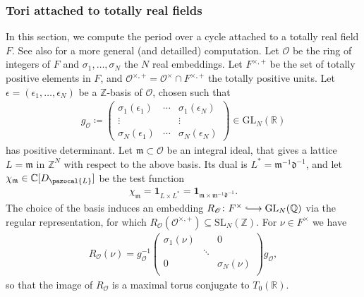 \documentclass[a4paper,11pt]{amsart} %
\newcommand{\8}{\infty}
\newcommand{\Z}{\mathbb{Z}}
\newcommand{\id}{\mathbf{1}}
\newcommand{\SL}{\mathrm{SL}}
\newcommand{\GL}{\mathrm{GL}}
\newcommand{\R}{\mathbb{R}}
\newcommand{\Q}{\mathbb{Q}}
\newcommand{\C}{\mathbb{C}}
\newcommand{\dfrak}{\mathfrak{d}}
\newcommand{\m}{\mathfrak{m}}
\newcommand{\Ocal}{\mathcal{O}}
\newcommand{\Lcal}{\pazocal{L}}
\newcommand{\hooklongrightarrow}{\lhook\joinrel\longrightarrow}
\theoremstyle{mytheoremstyle}
\theoremstyle{remark}
\numberwithin{equation}{section}
\begin{document}
 \subsubsection{Tori attached to totally real fields} \label{real tori} In this section, we compute the period over a cycle attached to a totally real field $F$. See also \cite{rbrsln2} for a more general (and detailled) computation. 
  Let $\Ocal$ be the ring of integers of $F$ and $\sigma_1,\dots,\sigma_N$ the $N$ real embeddings. Let $F^{\times,+}$ be the set of totally positive elements in $F$, and $\Ocal^{\times,+} = \Ocal^{\times} \cap F^{\times,+}$ the totally positive units. Let $\epsilon=(\epsilon_1, \dots, \epsilon_N)$ be a $\Z$-basis of $\Ocal$, chosen such that
\begin{align}
g_{\Ocal} \coloneqq \begin{pmatrix}
\sigma_1(\epsilon_1) & \cdots & \sigma_1(\epsilon_N) \\[1em]
\vdots & & \vdots \\[1em]
\sigma_N(\epsilon_1) & \cdots & \sigma_N(\epsilon_N)
\end{pmatrix} \in \GL_N(\R)
\end{align}
has positive determinant. Let $\m \subset \Ocal$ be an integral ideal, that gives a lattice $L=\m$ in $\Z^N$ with respect to the above basis. Its dual is $L^\ast=\m^{-1}\dfrak^{-1}$, and let $\chi_\m \in \C[D_{\Lcal}]$ be the test function
\begin{align}
\chi_\m=\id_{L \times L^\ast}=\id_{\m \times \m^{-1}\dfrak^{-1}}.
\end{align}
The choice of the basis induces an embedding $R_\Ocal \colon F^\times \hooklongrightarrow \GL_N(\Q)$ via the regular representation, for which $R_\Ocal(\Ocal^{\times,+}) \subseteq \SL_N(\Z)$. For $\nu \in F^\times$ we have
 \begin{align} \label{equiv embed F}
R_\Ocal(\nu)=g^{-1}_{\Ocal}\begin{pmatrix} \sigma_1(\nu) &  & 0 \\  & \ddots &  \\ 0 &  & \sigma_N(\nu) \\ \end{pmatrix}g_{\Ocal},
\end{align}
 so that the image of $R_\Ocal$ is a maximal torus conjugate to $T_0(\R)$.
 
\end{document}
